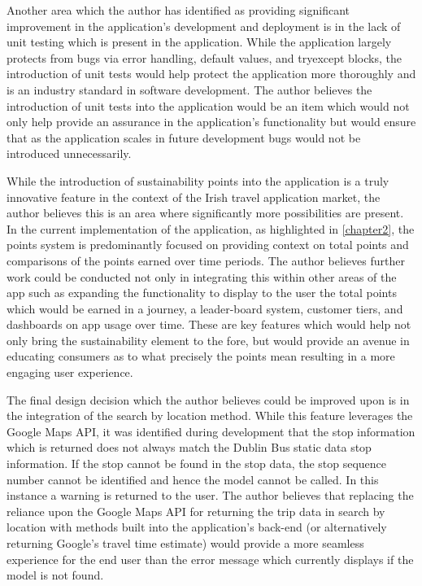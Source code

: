 \documentclass[]{UCD_CS_47360_Report}
\begin{document}
Another area which the author has identified as providing significant improvement in the application's development and deployment is in the lack of unit testing which is present in the application. While the application largely protects from bugs via error handling, default values, and try\/except blocks, the introduction of unit tests would help protect the application more thoroughly and is an industry standard in software development. The author believes the introduction of unit tests into the application would be an item which would not only help provide an assurance in the application's functionality but would ensure that as the application scales in future development bugs would not be introduced unnecessarily. 

While the introduction of sustainability points into the application is a truly innovative feature in the context of the Irish travel application market, the author believes this is an area where significantly more possibilities are present. In the current implementation of the application, as highlighted in \ref{chapter2}, the points system is predominantly focused on providing context on total points and comparisons of the points earned over time periods. The author believes further work could be conducted not only in integrating this within other areas of the app such as expanding the functionality to display to the user the total points which would be earned in a journey, a leader-board system, customer tiers, and dashboards on app usage over time. These are key features which would help not only bring the sustainability element to the fore, but would provide an avenue in educating consumers as to what precisely the points mean resulting in a more engaging user experience.

The final design decision which the author believes could be improved upon is in the integration of the search by location method. While this feature leverages the Google Maps API, it was identified during development that the stop information which is returned does not always match the Dublin Bus static data stop information. If the stop cannot be found in the stop data, the stop sequence number cannot be identified and hence the model cannot be called. In this instance a warning is returned to the user. The author believes that replacing the reliance upon the Google Maps API for returning the trip data in search by location with methods built into the application's back-end (or alternatively returning Google's travel time estimate) would provide a more seamless experience for the end user than the error message which currently displays if the model is not found.
\end{document}

